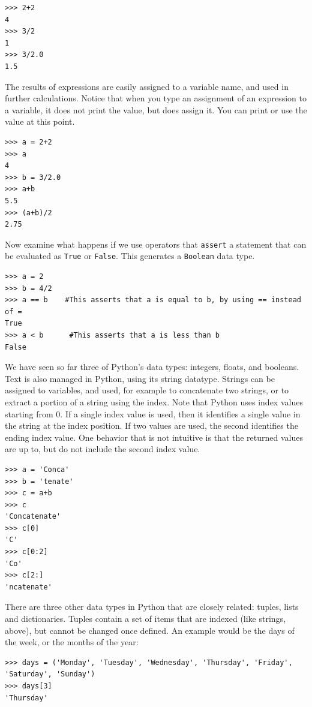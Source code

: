\begin{verbatim}
>>> 2+2
4
>>> 3/2
1
>>> 3/2.0
1.5
\end{verbatim}

The results of expressions are easily assigned to a variable name, and used in further calculations.  Notice that when you type an assignment of an expression to a variable, it does not print the value, but does assign it.  You can print or use the value at this point.  \\

\begin{verbatim}
>>> a = 2+2
>>> a
4
>>> b = 3/2.0
>>> a+b
5.5
>>> (a+b)/2
2.75
\end{verbatim}

Now examine what happens if we use operators that \verb#assert# a statement that can be evaluated as \verb#True# or \verb#False#.  This generates a \verb#Boolean# data type.

\begin{verbatim}
>>> a = 2
>>> b = 4/2
>>> a == b    #This asserts that a is equal to b, by using == instead of =
True
>>> a < b      #This asserts that a is less than b
False
\end{verbatim}

We have seen so far three of Python's data types: integers, floats, and booleans.  Text is also managed in Python, using its string datatype.  Strings can be assigned to variables, and used, for example to concatenate two strings, or to extract a portion of a string using the index.  Note that Python uses index values starting from 0.  If a single index value is used, then it identifies a single value in the string at the index position.  If two values are used, the second identifies the ending index value.  One behavior that is not intuitive is that the returned values are up to, but do not include the second index value.\\

\begin{verbatim}
>>> a = 'Conca'
>>> b = 'tenate'
>>> c = a+b
>>> c
'Concatenate'
>>> c[0]
'C'
>>> c[0:2]
'Co'
>>> c[2:]
'ncatenate'
\end{verbatim}

There are three other data types in Python that are closely related: tuples, lists and dictionaries.  Tuples contain a set of items that are indexed (like strings, above), but cannot be changed once defined.  An example would be the days of the week, or the months of the year:

\begin{verbatim}
>>> days = ('Monday', 'Tuesday', 'Wednesday', 'Thursday', 'Friday', 'Saturday', 'Sunday')
>>> days[3]
'Thursday'
\end{verbatim}

